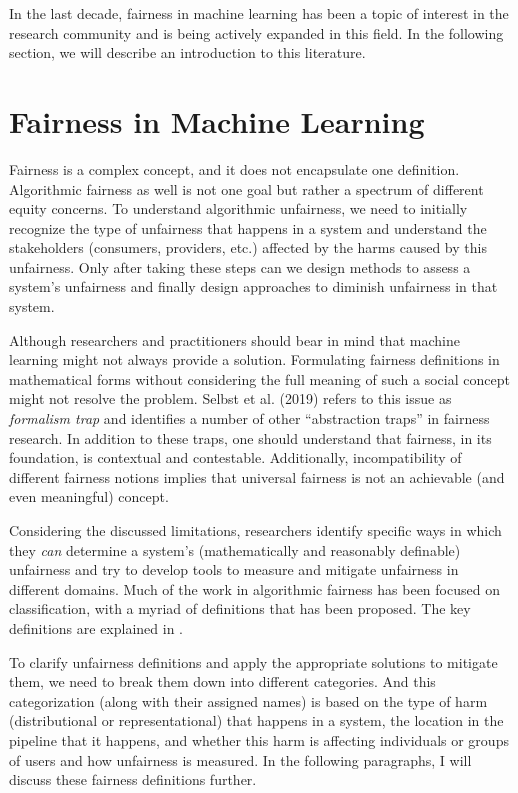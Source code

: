     In the last decade, fairness in machine learning has been a topic of interest in the research community and is being actively expanded in this field. In the following section, we will describe an introduction to this literature.

\section{Fairness in Machine Learning}
\label{sec:fair_ml}
    
    Fairness is a complex concept, and it does not encapsulate one definition. Algorithmic fairness as well is not one goal but rather a spectrum of different equity concerns. To understand algorithmic unfairness, we need to initially recognize the type of unfairness that happens in a system and understand the stakeholders (consumers, providers, etc.) affected by the harms caused by this unfairness. Only after taking these steps can we design methods to assess a system's unfairness and finally design approaches to diminish unfairness in that system.
    
    Although researchers and practitioners should bear in mind that machine learning might not always provide a solution. Formulating fairness definitions in mathematical forms without considering the full meaning of such a social concept might not resolve the problem. Selbst et al. (2019) \cite{selbst2019fairness} refers to this issue as \textit{formalism trap} and identifies a number of other ``abstraction traps'' in fairness research. In addition to these traps, one should understand that fairness, in its foundation, is contextual and contestable. Additionally, incompatibility of different fairness notions \cite{friedler-impossibility-2021} implies that universal fairness is not an achievable (and even meaningful) concept.
    
    Considering the discussed limitations, researchers identify specific ways in which they \textit{can} determine a system's (mathematically and reasonably definable) unfairness and try to develop tools to measure and mitigate unfairness in different domains. Much of the work in algorithmic fairness has been focused on classification, with a myriad of definitions that has been proposed. The key definitions are explained in \cite{mitchell2021algorithmic,barocas2016big,barocas2018fairness}.
    
    To clarify unfairness definitions and apply the appropriate solutions to mitigate them, we need to break them down into different categories. And this categorization (along with their assigned names) is based on the type of harm (distributional or representational) that happens in a system, the location in the pipeline that it happens, and whether this harm is affecting individuals or groups of users and how unfairness is measured. In the following paragraphs, I will discuss these fairness definitions further.

